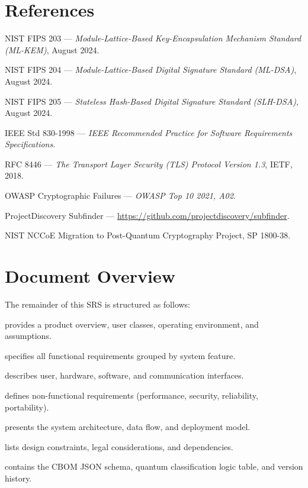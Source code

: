 \section{References}
\label{sec:references}

\begin{enumerate}[noitemsep, label={[\arabic*]}]
  \item NIST FIPS 203 — \textit{Module-Lattice-Based Key-Encapsulation Mechanism
        Standard (ML-KEM)}, August 2024.
  \item NIST FIPS 204 — \textit{Module-Lattice-Based Digital Signature Standard
        (ML-DSA)}, August 2024.
  \item NIST FIPS 205 — \textit{Stateless Hash-Based Digital Signature Standard
        (SLH-DSA)}, August 2024.
  \item IEEE Std 830-1998 — \textit{IEEE Recommended Practice for Software
        Requirements Specifications}.
  \item RFC 8446 — \textit{The Transport Layer Security (TLS) Protocol Version 1.3},
        IETF, 2018.
  \item OWASP Cryptographic Failures — \textit{OWASP Top 10 2021, A02}.
  \item ProjectDiscovery Subfinder — \url{https://github.com/projectdiscovery/subfinder}.
  \item NIST NCCoE Migration to Post-Quantum Cryptography Project, SP 1800-38.
\end{enumerate}

\section{Document Overview}
\label{sec:doc_overview}

The remainder of this SRS is structured as follows:

\begin{description}[noitemsep, leftmargin=2cm]
  \item[Chapter~\ref{chap:overall_desc}] provides a product overview, user classes,
        operating environment, and assumptions.
  \item[Chapter~\ref{chap:functional}] specifies all functional requirements grouped
        by system feature.
  \item[Chapter~\ref{chap:external_interfaces}] describes user, hardware, software,
        and communication interfaces.
  \item[Chapter~\ref{chap:nonfunctional}] defines non-functional requirements
        (performance, security, reliability, portability).
  \item[Chapter~\ref{chap:architecture}] presents the system architecture, data
        flow, and deployment model.
  \item[Chapter~\ref{chap:constraints}] lists design constraints, legal
        considerations, and dependencies.
  \item[Chapter~\ref{chap:appendix}] contains the CBOM JSON schema, quantum
        classification logic table, and version history.
\end{description}
